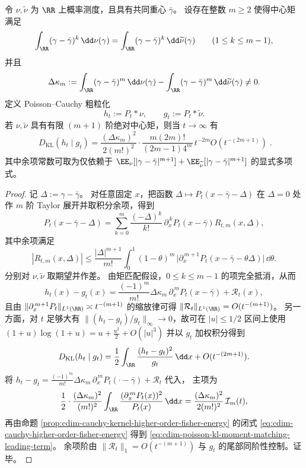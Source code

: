 \begin{proposition}\label{prop:cdim-poisson-kl-moment-matching-leading-term}
令 \(\nu,\widetilde\nu\) 为 \(\RR\) 上概率测度，且具有共同重心 \(\bar\gamma\)。
设存在整数 \(m\ge 2\) 使得中心矩满足
\[
\int_{\RR}(\gamma-\bar\gamma)^k\,\dd\nu(\gamma)
=\int_{\RR}(\gamma-\bar\gamma)^k\,\dd\widetilde\nu(\gamma)
\qquad(1\le k\le m-1),
\]
并且
\[
\Delta\kappa_m
:=\int_{\RR}(\gamma-\bar\gamma)^m\,\dd\nu(\gamma)
-\int_{\RR}(\gamma-\bar\gamma)^m\,\dd\widetilde\nu(\gamma)
\neq 0.
\]
定义 Poisson--Cauchy 粗粒化
\[
h_t:=P_t*\nu,
\qquad
g_t:=P_t*\widetilde\nu.
\]
若 \(\nu,\widetilde\nu\) 具有有限 \((m+1)\) 阶绝对中心矩，则当 \(t\to\infty\) 有
\begin{equation}\label{eq:cdim-poisson-kl-moment-matching-leading-term}
\boxed{\;
D_{\mathrm{KL}}(h_t\mid g_t)
=\frac{(\Delta\kappa_m)^2}{2(m!)^2}\cdot \frac{m(2m)!}{(2m-1)4^m}\,t^{-2m}
O(t^{-(2m+1)})\; }.
\end{equation}
其中余项常数可取为仅依赖于 \(\EE_\nu[|\gamma-\bar\gamma|^{m+1}]+\EE_{\widetilde\nu}[|\gamma-\bar\gamma|^{m+1}]\) 的显式多项式。
\end{proposition}
\begin{proof}
记 \(\Delta:=\gamma-\bar\gamma\)。
对任意固定 \(x\)，把函数 \(\Delta\mapsto P_t(x-\bar\gamma-\Delta)\) 在 \(\Delta=0\) 处作 \(m\) 阶 Taylor 展开并取积分余项，得到
\[
P_t(x-\bar\gamma-\Delta)
=\sum_{k=0}^{m}\frac{(-\Delta)^k}{k!}\,\partial_x^{\,k}P_t(x-\bar\gamma)
R_{t,m}(x,\Delta),
\]
其中余项满足
\[
|R_{t,m}(x,\Delta)|
\le \frac{|\Delta|^{m+1}}{m!}\int_0^1(1-\theta)^m\,
\bigl|\partial_x^{\,m+1}P_t(x-\bar\gamma-\theta\Delta)\bigr|\,\dd\theta.
\]
分别对 \(\nu,\widetilde\nu\) 取期望并作差。
由矩匹配假设，\(0\le k\le m-1\) 的项完全抵消，从而
\[
h_t(x)-g_t(x)
=\frac{(-1)^m}{m!}\Delta\kappa_m\,\partial_x^{\,m}P_t(x-\bar\gamma)+\mathcal R_t(x),
\]
且由 \(\|\partial_x^{\,m+1}P_t\|_{L^1(\RR)}\asymp t^{-(m+1)}\) 的缩放律可得
\(
\|\mathcal R_t\|_{L^1(\RR)}=O(t^{-(m+1)})
\)。
另一方面，对 \(t\) 足够大有 \(\| (h_t-g_t)/g_t\|_\infty\to 0\)，故可在 \(|u|\le 1/2\) 区间上使用
\(
(1+u)\log(1+u)=u+\frac{u^2}{2}+O(|u|^3)
\)
并以 \(g_t\) 加权积分得到
\[
D_{\mathrm{KL}}(h_t\mid g_t)
=\frac12\int_{\RR}\frac{(h_t-g_t)^2}{g_t}\,\dd x+O(t^{-(2m+1)}).
\]
将 \(h_t-g_t=\frac{(-1)^m}{m!}\Delta\kappa_m\,\partial_x^{\,m}P_t(\cdot-\bar\gamma)+\mathcal R_t\) 代入，
主项为
\[
\frac12\cdot\frac{(\Delta\kappa_m)^2}{(m!)^2}
\int_{\RR}\frac{(\partial_x^{\,m}P_t(x))^2}{P_t(x)}\,\dd x
=\frac{(\Delta\kappa_m)^2}{2(m!)^2}\,\mathcal I_m(t),
\]
再由命题 \ref{prop:cdim-cauchy-kernel-higher-order-fisher-energy} 的闭式 \eqref{eq:cdim-cauchy-higher-order-fisher-energy} 得到 \eqref{eq:cdim-poisson-kl-moment-matching-leading-term}。
余项阶由 \(\|\mathcal R_t\|_1=O(t^{-(m+1)})\) 与 \(g_t\) 的尾部同阶性控制。证毕。
\end{proof}


